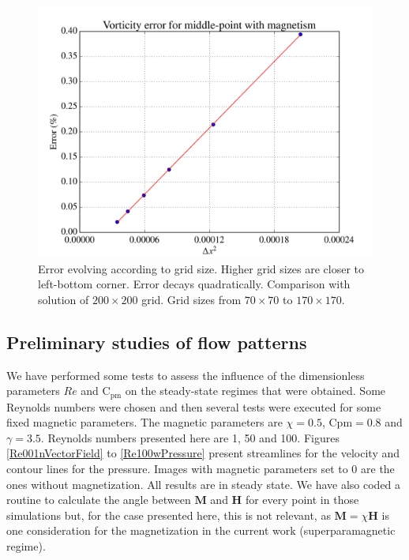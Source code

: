 \documentclass[journal]{IEEEtran}
\begin{document}
\begin{figure}[!t]
\centering
\includegraphics[width=\linewidth]{figures/validateMagnetismRe40}
\caption{Error evolving according to grid size. Higher grid sizes are closer to left-bottom corner. Error decays quadratically. Comparison with solution of $200\times 200$ grid. Grid sizes from $70\times 70$ to $170\times 170$. \label{magneticTest}}
\end{figure}



\subsection{Preliminary studies of flow patterns}
We have performed some tests to assess the influence of the dimensionless parameters $\mathit{Re}$ and $\mathrm{C}_\mathrm{pm}$ on the steady-state regimes that were obtained.  Some Reynolds numbers were chosen and then several tests were executed for some fixed magnetic parameters. The magnetic parameters are $\chi=0.5$, $\mathrm{Cpm}=0.8$ and $\gamma=3.5$. Reynolds numbers presented here are 1, 50 and 100. Figures \ref{Re001nVectorField} to \ref{Re100wPressure} present streamlines for the velocity and contour lines for the pressure. Images with magnetic parameters set to 0 are the ones without magnetization. All results are in steady state. We have also coded a routine to calculate the angle between $\mathbf{M}$ and $\mathbf{H}$ for every point in those simulations but, for the case presented here, this is not relevant, as $\mathbf{M}=\chi\mathbf{H}$ is one consideration for the magnetization in the current work (superparamagnetic regime).
\end{document}
